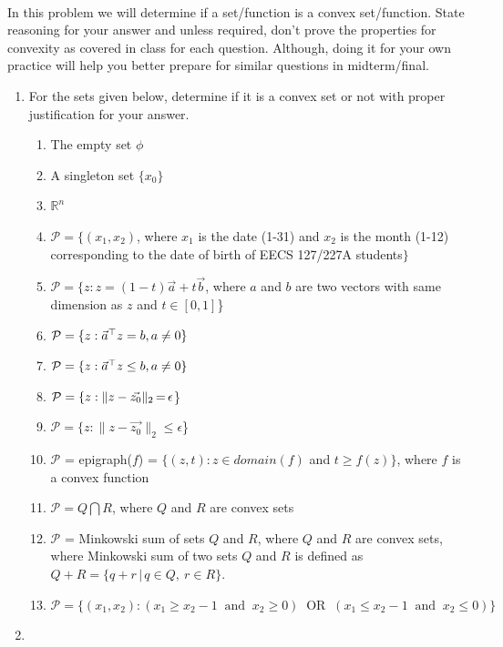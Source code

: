 \\
In this problem we will determine if a set/function is a convex set/function. State reasoning for your answer and unless required, don't prove the properties for convexity as covered in class for each question. Although, doing it for your own practice will help you better prepare for similar questions in midterm/final.
\begin{enumerate}
\item
For the sets given below, determine if it is a convex set or not with proper justification for your answer.
\begin{enumerate}
    \item
    The empty set $\phi$
    \item
    A singleton set $\{x_0\}$
    \item
    $\mathbb{R}^n$
    \item
    $\mathcal{P} = \{(x_1,x_2)$, where $x_1$ is the date (1-31) and $x_2$ is the month (1-12) corresponding to the date of birth of EECS 127/227A students$\}$
    \item
    $\mathcal{P} = \{z : z = (1-t)\vec{a} + t\vec{b}$, where $a$ and $b$ are two vectors with same dimension as $z$ and $t\in [0,1]$\}
    \item
    $\mathcal{P} = \{z : \vec{a}^{\top} z = b, a \neq 0\}$
    \item
    $\mathcal{P} = \{z : \vec{a}^{\top} z \leq b, a \neq 0\}$
    \item
    $\mathcal{P} = \{z : \|z - \vec{z_0}\|_2 {\,{=}\,} \epsilon$\}
    \item
    $\mathcal{P} = \{z : \|z - \vec{z_0}\|_2 \leq \epsilon$\}
    \item
    $\mathcal{P}$ = epigraph($f$) = $\{(z,t) : z\in domain(f)$ and $t \geq f(z)\}$, where $f$ is a convex function
    \item
    $\mathcal{P} = Q\bigcap R$, where $Q$ and $R$ are convex sets
    \item
    $\mathcal{P}$  = Minkowski sum of sets $Q$ and $R$, where $Q$ and $R$ are convex sets, where Minkowski sum of two sets $Q$ and $R$ is defined as $Q + R =\{q +r \,|\,q \in Q,\ r \in R\}$.
    \item
    $\mathcal{P} = \{(x_1,x_2): (x_1 \geq x_2-1 \;\;\text{and}\;\; x_2 \geq 0) \;\;\text{OR}\;\; (x_1 \leq x_2-1 \;\;\text{and}\;\; x_2 \leq 0)\}$
\end{enumerate}
\sol{
    
    }
\item

\end{enumerate}
